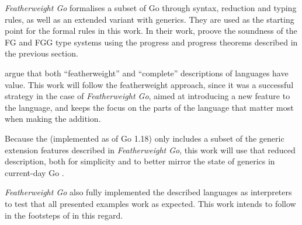 \emph{Featherweight Go} formalises a subset of Go through syntax, reduction and
typing rules, as well as an extended variant with generics. They are used as the
starting point for the formal rules in this work. In their work, \citeauthor{fg}
proove the soundness of the FG and FGG type systems using the progress and
progress theorems described in the previous section.

\citeauthor{fg} argue that both ``featherweight'' and ``complete'' descriptions
of languages have value. This work will follow the featherweight approach, since
it was a successful strategy in the case of \emph{Featherweight Go}, aimed at
introducing a new feature to the language, and keeps the focus on the parts of
the language that matter most when making the addition.

Because the  (implemented as of Go 1.18) only
includes a subset of the generic extension features described in
\emph{Featherweight Go}, this work will use that reduced description, both for
simplicity and to better mirror the state of generics in current-day Go
\autocite{genericsProposal}.

\emph{Featherweight Go} also fully implemented the described languages as
interpreters to test that all presented examples work as expected. This work
intends to follow in the footsteps of \citeauthor{fg} in this regard.

